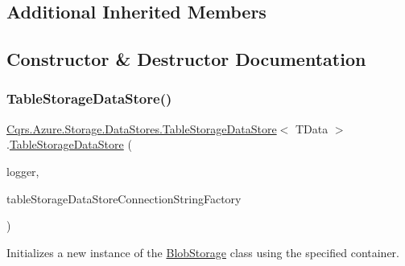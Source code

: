 \subsection*{Additional Inherited Members}


\subsection{Constructor \& Destructor Documentation}
\mbox{\label{classCqrs_1_1Azure_1_1Storage_1_1DataStores_1_1TableStorageDataStore_a25a32a83c14eb5068f5bc9bcacfa15f6_a25a32a83c14eb5068f5bc9bcacfa15f6}} 
\subsubsection{\texorpdfstring{Table\+Storage\+Data\+Store()}{TableStorageDataStore()}}
{\footnotesize\ttfamily \hyperlink{classCqrs_1_1Azure_1_1Storage_1_1DataStores_1_1TableStorageDataStore}{Cqrs.\+Azure.\+Storage.\+Data\+Stores.\+Table\+Storage\+Data\+Store}$<$ T\+Data $>$.\hyperlink{classCqrs_1_1Azure_1_1Storage_1_1DataStores_1_1TableStorageDataStore}{Table\+Storage\+Data\+Store} (\begin{DoxyParamCaption}\item[{I\+Logger}]{logger,  }\item[{\hyperlink{interfaceCqrs_1_1Azure_1_1BlobStorage_1_1DataStores_1_1ITableStorageDataStoreConnectionStringFactory}{I\+Table\+Storage\+Data\+Store\+Connection\+String\+Factory}}]{table\+Storage\+Data\+Store\+Connection\+String\+Factory }\end{DoxyParamCaption})}



Initializes a new instance of the \hyperlink{namespaceCqrs_1_1Azure_1_1BlobStorage}{Blob\+Storage} class using the specified container. 



